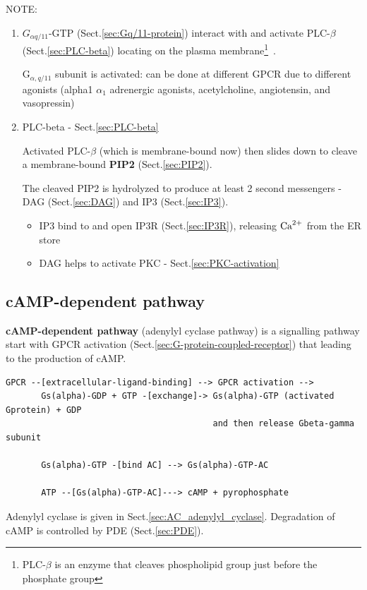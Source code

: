 NOTE:
\begin{enumerate}
  \item  $G_{\alpha q/11}$-GTP
(Sect.\ref{sec:Gq/11-protein}) interact with and activate PLC-$\beta$
(Sect.\ref{sec:PLC-beta}) locating on the plasma membrane\footnote{PLC-$\beta$
is an enzyme that cleaves phospholipid  group just before the phosphate
group}~\citep{smrcka1991ip3}.

G$_{\alpha,q/11}$ subunit is activated: can be done at different GPCR
  due to different agonists (alpha1 $\alpha_1$ adrenergic agonists,
  acetylcholine, angiotensin, and vasopressin)
  

  \item PLC-beta - Sect.\ref{sec:PLC-beta}
  
Activated PLC-$\beta$ (which is membrane-bound now) then slides down to cleave a
membrane-bound {\bf PIP2} (Sect.\ref{sec:PIP2}). 

The cleaved PIP2 is hydrolyzed to produce at least 2 second messengers - DAG
(Sect.\ref{sec:DAG}) and IP3 (Sect.\ref{sec:IP3}).

\begin{itemize}

  \item IP3 bind to and open IP3R (Sect.\ref{sec:IP3R}), releasing ${\text{Ca}^{2+}}$ from
  the ER store

  \item DAG helps to activate PKC - Sect.\ref{sec:PKC-activation}  
\end{itemize}
    
\end{enumerate}


\subsection{cAMP-dependent pathway}
\label{sec:cAMP-dependent_pathway}


{\bf cAMP-dependent pathway} (adenylyl cyclase pathway) is a signalling pathway
start with GPCR activation (Sect.\ref{sec:G-protein-coupled-receptor}) that
leading to the production of cAMP.
\begin{verbatim}
GPCR --[extracellular-ligand-binding] --> GPCR activation -->
       Gs(alpha)-GDP + GTP -[exchange]-> Gs(alpha)-GTP (activated Gprotein) + GDP 
                                         and then release Gbeta-gamma subunit
       
       Gs(alpha)-GTP -[bind AC] --> Gs(alpha)-GTP-AC
        
       ATP --[Gs(alpha)-GTP-AC]---> cAMP + pyrophosphate 
\end{verbatim}
Adenylyl cyclase is given in Sect.\ref{sec:AC_adenylyl_cyclase}. Degradation of
cAMP is controlled by PDE (Sect.\ref{sec:PDE}).


